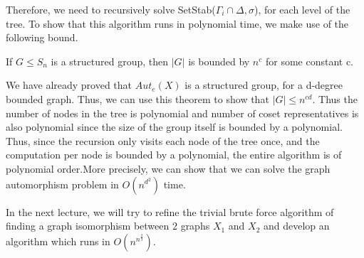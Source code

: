 Therefore, we need to recursively solve SetStab($\Gamma_{i} \cap \Delta, \sigma$), for each level of the tree. To show that this algorithm runs in polynomial time, we make use of the following bound.

\begin{theorem}
If $G \leqslant S_{n}$ is a structured group, then $|G|$ is bounded by $n^{c}$  for some constant c.
\end{theorem}

We have already proved that $Aut_{e}(X)$ is a structured group, for a d-degree bounded graph. Thus, we can use this theorem to show that $|G| \leq n^{cd}$. Thus the number of nodes in the tree is polynomial and number of coset representatives is also polynomial since the size of the group itself is bounded by a polynomial. Thus, since the recursion only visits each node of the tree once, and the computation per node is bounded by a polynomial, the entire algorithm is of polynomial order.More precisely, we can show that we can solve the graph automorphism problem in $O(n^{d^{2}})$ time.

In the next lecture, we will try to refine the trivial brute force algorithm of finding a graph isomorphism between $2$ graphs $X_{1}$ and $X_{2}$ and develop an algorithm which runs in $O(n^{n^{\frac{2}{3}}})$.

